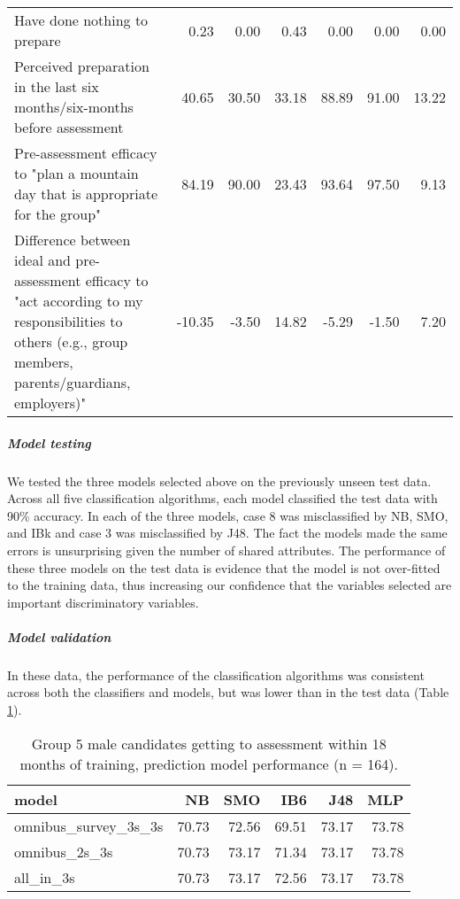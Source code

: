 \documentclass[a4paper,]{book}
\let\oldsubparagraph\subparagraph
\renewcommand{\subparagraph}[1]{\oldsubparagraph{#1}\mbox{}}
\begin{document}
\begin{table}
\begin{tabular}[t]{lrrrrrr}
Have done nothing to prepare & 0.23 & 0.00 & 0.43 & 0.00 & 0.00 & 0.00\\
Perceived preparation in the last six months/six-months before assessment & 40.65 & 30.50 & 33.18 & 88.89 & 91.00 & 13.22\\
\addlinespace
Pre-assessment efficacy to "plan a mountain day that is appropriate for the group" & 84.19 & 90.00 & 23.43 & 93.64 & 97.50 & 9.13\\
Difference between ideal and pre-assessment efficacy to "act according to my responsibilities to others (e.g., group members, parents/guardians, employers)" & -10.35 & -3.50 & 14.82 & -5.29 & -1.50 & 7.20\\
\bottomrule
\end{tabular}
\end{table}

\hypertarget{model-testing-1}{%
\subparagraph{Model testing}\label{model-testing-1}}

We tested the three models selected above on the previously unseen test data. Across all five classification algorithms, each model classified the test data with 90\% accuracy. In each of the three models, case 8 was misclassified by NB, SMO, and IBk and case 3 was misclassified by J48. The fact the models made the same errors is unsurprising given the number of shared attributes. The performance of these three models on the test data is evidence that the model is not over-fitted to the training data, thus increasing our confidence that the variables selected are important discriminatory variables.

\hypertarget{model-validation}{%
\subparagraph{Model validation}\label{model-validation}}

In these data, the performance of the classification algorithms was consistent across both the classifiers and models, but was lower than in the test data (Table \ref{tab:g5-male-gta18m-valid}).

\begin{table}

\caption{\label{tab:g5-male-gta18m-valid}Group 5 male candidates getting to assessment within 18 months of training, prediction model performance (n = 164).}
\centering
\begin{tabular}[t]{lrrrrr}
\toprule
model & NB & SMO & IB6 & J48 & MLP\\
\midrule
omnibus\_survey\_3s\_3s & 70.73 & 72.56 & 69.51 & 73.17 & 73.78\\
omnibus\_2s\_3s & 70.73 & 73.17 & 71.34 & 73.17 & 73.78\\
all\_in\_3s & 70.73 & 73.17 & 72.56 & 73.17 & 73.78\\
\bottomrule
\end{tabular}
\end{table}
\end{document}
